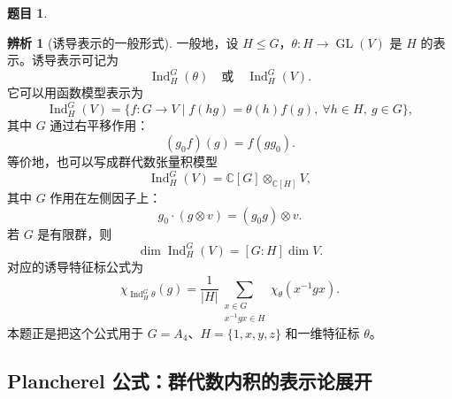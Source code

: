 \documentclass[a4paper]{ctexart}
\theoremstyle{definition}
\newtheorem{example}{题目}[section]
\theoremstyle{analysis}
\newtheorem{remark}{辨析}[section]
\theoremstyle{plain}
\begin{document}
\begin{example}
\begin{remark}[诱导表示的一般形式]
一般地，设 \(H\leq G\)，\(\theta:H\to\operatorname{GL}(V)\) 是 \(H\) 的表示。诱导表示可记为
\[
  \operatorname{Ind}_H^G(\theta)
  \quad\text{或}\quad
  \operatorname{Ind}_H^G(V).
\]
它可以用函数模型表示为
\[
  \operatorname{Ind}_H^G(V)
  =
  \{f:G\to V\mid f(hg)=\theta(h)f(g),\ \forall h\in H,\ g\in G\},
\]
其中 \(G\) 通过右平移作用：
\[
  (g_0f)(g)=f(gg_0).
\]
等价地，也可以写成群代数张量积模型
\[
  \operatorname{Ind}_H^G(V)
  =
  \mathbb C[G]\otimes_{\mathbb C[H]}V,
\]
其中 \(G\) 作用在左侧因子上：
\[
  g_0\cdot(g\otimes v)=(g_0g)\otimes v.
\]
若 \(G\) 是有限群，则
\[
  \dim\operatorname{Ind}_H^G(V)=[G:H]\dim V.
\]
对应的诱导特征标公式为
\[
  \chi_{\operatorname{Ind}_H^G\theta}(g)
  =
  \frac{1}{|H|}
  \sum_{\substack{x\in G\\ x^{-1}gx\in H}}
  \chi_\theta(x^{-1}gx).
\]
本题正是把这个公式用于 \(G=A_4\)、\(H=\{1,x,y,z\}\) 和一维特征标 \(\theta\)。
\end{remark}
\end{example}

\subsection{\texorpdfstring{Plancherel 公式：群代数内积的表示论展开}{Plancherel 公式}}\label{subsec:problem-serre-plancherel-formula}
\end{document}
